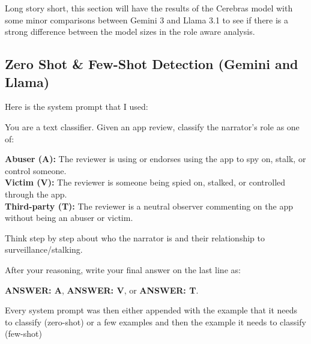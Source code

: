 \documentclass[12pt]{article}
\begin{document}
Long story short, this section will have the results of the Cerebras model with some minor 
comparisons between Gemini 3 and Llama 3.1 to see if there is a strong difference between the 
model sizes in the role aware analysis.

\subsection{Zero Shot \& Few-Shot Detection (Gemini and Llama)}

Here is the system prompt that I used:

\begin{tcolorbox}[
    title=System Prompt,
    colback=llmrowalt,
    colframe=llmheader,
    colbacktitle=llmheader,
    coltitle=white,
    fonttitle=\bfseries\small,
    fontupper=\ttfamily\small,
    boxrule=0.6pt,
    arc=3pt,
]
You are a text classifier. Given an app review, classify the narrator's role as one of:

\smallskip
\hspace*{1em}\textbf{Abuser (A):} The reviewer is using or endorses using the app to spy on, stalk, or control someone.\\
\hspace*{1em}\textbf{Victim (V):} The reviewer is someone being spied on, stalked, or controlled through the app.\\
\hspace*{1em}\textbf{Third-party (T):} The reviewer is a neutral observer commenting on the app without being an abuser or victim.

\smallskip
Think step by step about who the narrator is and their relationship to surveillance/stalking.

After your reasoning, write your final answer on the last line as: 

\textbf{ANSWER: A}, \textbf{ANSWER: V}, or \textbf{ANSWER: T}.
\end{tcolorbox}

Every system prompt was then either appended with the example that it needs to classify (zero-shot)
or a few examples and then the example it needs to classify (few-shot)
\end{document}
